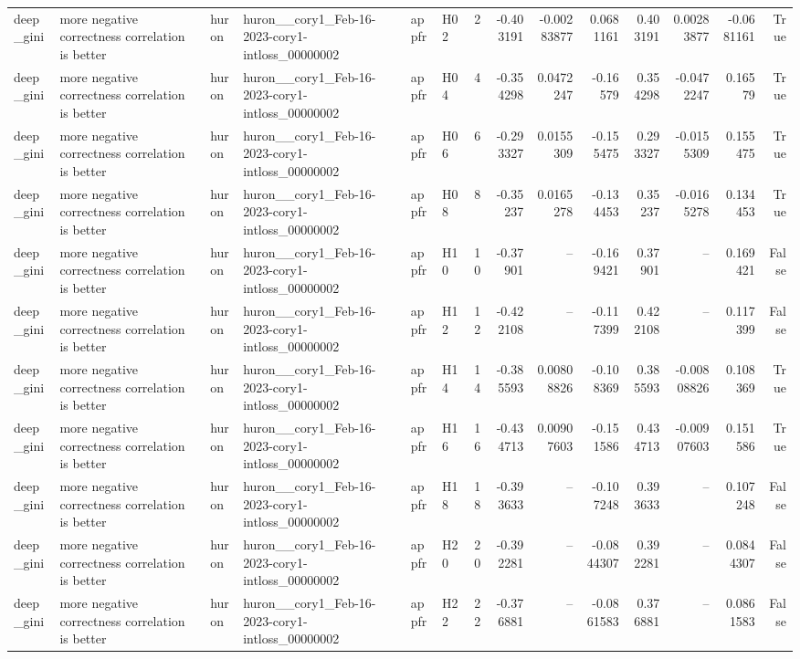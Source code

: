 \begin{longtable}{llllllrrrrrrrr}
deep\_gini & more negative correctness correlation is better & huron & huron\_\_cory1\_Feb-16-2023-cory1-intloss\_00000002 & appfr & H02 & 2 & -0.403191 & -0.00283877 & 0.0681161 & 0.403191 & 0.00283877 & -0.0681161 & True \\
deep\_gini & more negative correctness correlation is better & huron & huron\_\_cory1\_Feb-16-2023-cory1-intloss\_00000002 & appfr & H04 & 4 & -0.354298 & 0.0472247 & -0.16579 & 0.354298 & -0.0472247 & 0.16579 & True \\
deep\_gini & more negative correctness correlation is better & huron & huron\_\_cory1\_Feb-16-2023-cory1-intloss\_00000002 & appfr & H06 & 6 & -0.293327 & 0.0155309 & -0.155475 & 0.293327 & -0.0155309 & 0.155475 & True \\
deep\_gini & more negative correctness correlation is better & huron & huron\_\_cory1\_Feb-16-2023-cory1-intloss\_00000002 & appfr & H08 & 8 & -0.35237 & 0.0165278 & -0.134453 & 0.35237 & -0.0165278 & 0.134453 & True \\
deep\_gini & more negative correctness correlation is better & huron & huron\_\_cory1\_Feb-16-2023-cory1-intloss\_00000002 & appfr & H10 & 10 & -0.37901 & -- & -0.169421 & 0.37901 & -- & 0.169421 & False \\
deep\_gini & more negative correctness correlation is better & huron & huron\_\_cory1\_Feb-16-2023-cory1-intloss\_00000002 & appfr & H12 & 12 & -0.422108 & -- & -0.117399 & 0.422108 & -- & 0.117399 & False \\
deep\_gini & more negative correctness correlation is better & huron & huron\_\_cory1\_Feb-16-2023-cory1-intloss\_00000002 & appfr & H14 & 14 & -0.385593 & 0.00808826 & -0.108369 & 0.385593 & -0.00808826 & 0.108369 & True \\
deep\_gini & more negative correctness correlation is better & huron & huron\_\_cory1\_Feb-16-2023-cory1-intloss\_00000002 & appfr & H16 & 16 & -0.434713 & 0.00907603 & -0.151586 & 0.434713 & -0.00907603 & 0.151586 & True \\
deep\_gini & more negative correctness correlation is better & huron & huron\_\_cory1\_Feb-16-2023-cory1-intloss\_00000002 & appfr & H18 & 18 & -0.393633 & -- & -0.107248 & 0.393633 & -- & 0.107248 & False \\
deep\_gini & more negative correctness correlation is better & huron & huron\_\_cory1\_Feb-16-2023-cory1-intloss\_00000002 & appfr & H20 & 20 & -0.392281 & -- & -0.0844307 & 0.392281 & -- & 0.0844307 & False \\
deep\_gini & more negative correctness correlation is better & huron & huron\_\_cory1\_Feb-16-2023-cory1-intloss\_00000002 & appfr & H22 & 22 & -0.376881 & -- & -0.0861583 & 0.376881 & -- & 0.0861583 & False \\

\end{longtable}
